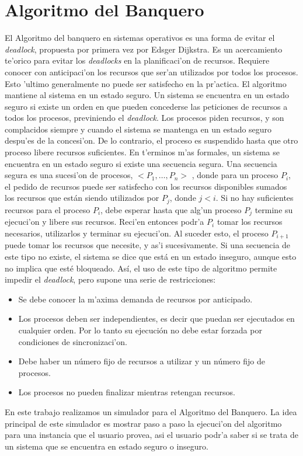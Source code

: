 \section{Algoritmo del Banquero}
El Algoritmo del banquero en sistemas operativos es una forma de evitar el
\emph{deadlock}, propuesta por primera vez por Edsger Dijkstra. Es un
acercamiento te'orico para evitar los \emph{deadlocks} en la planificaci'on de
recursos. Requiere conocer con anticipaci'on los recursos que ser'an utilizados
por todos los procesos. Esto 'ultimo generalmente no puede ser satisfecho en la
pr'actica.
El algoritmo mantiene al sistema en un estado seguro. Un sistema se encuentra
en un estado seguro si existe un orden en que pueden concederse las peticiones
de recursos a todos los procesos, previniendo el \emph{deadlock}.
Los procesos piden recursos, y son complacidos siempre y cuando el sistema se
mantenga en un estado seguro despu'es de la concesi'on. De lo contrario, el
proceso es suspendido hasta que otro proceso libere recursos suficientes.
En t'erminos m'as formales, un sistema se encuentra en un estado seguro si
existe una secuencia segura. Una secuencia segura es una sucesi'on de procesos,
$< P_1,\ldots, P_n >$ , donde para un proceso $P_i$, el pedido de recursos
puede ser satisfecho con los recursos disponibles sumados los recursos que
están siendo utilizados por $P_j$, donde $j < i$. Si no hay suficientes
recursos para el proceso $P_i$, debe esperar hasta que alg'un proceso $P_j$
termine su ejecuci'on y libere sus recursos. Reci'en entonces podr'a $P_i$
tomar los recursos necesarios, utilizarlos y terminar su ejecuci'on. Al suceder
esto, el proceso $P_{i+1}$ puede tomar los recursos que necesite, y as'i
sucesivamente. Si una secuencia de este tipo no existe, el sistema se dice que
está en un estado inseguro, aunque esto no implica que esté bloqueado.
Así, el uso de este tipo de algoritmo permite impedir el \emph{deadlock}, pero
supone una serie de restricciones:
\begin{itemize}
 \item Se debe conocer la m'axima demanda de recursos por anticipado.
 \item Los procesos deben ser independientes, es decir que puedan ser
ejecutados en cualquier orden. Por lo tanto su ejecución no debe estar forzada
por condiciones de sincronizaci'on.
 \item Debe haber un número fijo de recursos a utilizar y un número fijo de
procesos.
 \item Los procesos no pueden finalizar mientras retengan recursos.
\end{itemize}
En este trabajo realizamos un simulador para el Algoritmo del Banquero. La idea
principal de este simulador es mostrar paso a paso la ejecuci'on del algoritmo
para una instancia que el usuario provea, asi el usuario podr'a saber si se
trata de un sistema que se encuentra en estado seguro o inseguro.

